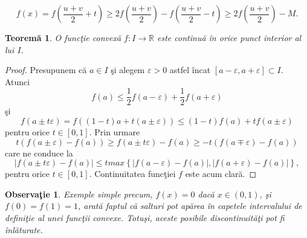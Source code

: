 \documentclass[a4paper,12pt,oneside]{report}
\newtheorem{theorem}{Teorem\u a}
\newtheorem{remark}{Observa\c{t}ie}
\begin{document}
\begin{displaymath}
  f\left ( x \right )=  f\left ( \frac{u+v}{2} + t\right )\geq 2 f\left ( \frac{u + v}{2} \right )- f\left ( \frac{u + v}{2} - t\right )\geq 2f\left ( \frac{u+v}{2} \right ) - M.
\end{displaymath}

\begin{theorem}
O func\c{t}ie convex\u{a} \(f: I \rightarrow \mathbb{R}\) este continu\u{a} \^{i}n orice punct interior al lui \(I\).   
\end{theorem}
\begin{proof}
  Presupunem c\u{a} \(a\in I\) \c{s}i alegem \(\varepsilon > 0\) astfel \^{i}ncat \(\left [ a - \varepsilon , a + \varepsilon  \right ] \subset I\).
 Atunci
\begin{displaymath}
  f\left ( a \right )\leq \frac{1}{2} f\left ( a - \varepsilon  \right ) + \frac{1}{2}f \left ( a + \varepsilon  \right )
\end{displaymath}
\c{s}i
\begin{displaymath}
  f\left ( a \pm t\varepsilon  \right )= f\left ( \left ( 1 - t \right ) a + t\left ( a \pm \varepsilon  \right )\right )\leq \left ( 1 - t \right )f\left ( a \right ) + tf\left ( a\pm \varepsilon  \right )
\end{displaymath}
pentru orice \(t\in \left [ 0 , 1 \right ]\). Prin urmare
\begin{displaymath}
  t\left ( f\left ( a\pm \varepsilon  \right ) - f\left ( a \right ) \right )\geq f\left ( a\pm t\varepsilon  \right )- f\left ( a \right )\geq -t\left ( f\left ( a\mp \varepsilon  \right ) - f\left ( a \right )\right )
\end{displaymath}
care ne conduce la
\begin{displaymath}
\left | f\left ( a\pm t\varepsilon  \right )- f\left ( a \right ) \right |\leq t max \left \{ \left | f\left ( a-\varepsilon  \right )- f\left ( a \right ) \right |, \left | f\left ( a+\varepsilon  \right ) - f\left ( a \right )\right | \right \},
\end{displaymath}
 pentru orice \(t\in \left [ 0 , 1 \right ]\). Continuitatea func\c{t}iei \(f\) este acum clar\u{a}.
 \end{proof}

 \begin{remark}
  Exemple simple precum, \(f\left ( x \right )= 0\) dac\u{a} \(x\in \left ( 0 , 1 \right )\), \c{s}i  \(f\left ( 0 \right )= f\left ( 1 \right ) = 1\), arat\u{a} faptul c\u{a} salturi  pot ap\u{a}rea \^{i}n capetele intervalului de defini\c{t}ie al unei func\c{t}ii convexe. Totu\c{s}i, aceste posibile discontinuit\u{a}\c{t}i pot fi \^{i}nl\u{a}turate.
\end{remark}
\end{document}
